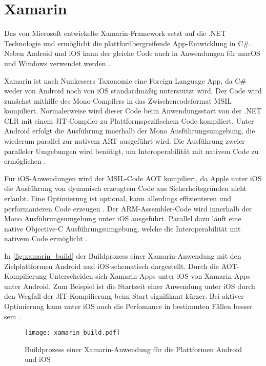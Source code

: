 \section{Xamarin}
\label{sec:Frameworks_Xamarin}

Das von Microsoft entwickelte Xamarin-Framework setzt auf die .NET Technologie und ermöglicht die plattforübergreifende App-Entwicklung in C\#.
Neben Android und iOS kann der gleiche Code auch in Anwendungen für macOS und Windows verwendet werden \cite{Xamarin_Homepage}.



Xamarin ist nach Nunkessers Taxonomie \cite{Nunkesser_Taxonomy} eine Foreign Language App, da C\# weder von Android noch von iOS standardmäßig unterstützt wird.
Der Code wird zunächst mithilfe des Mono-Compilers in das Zwischencodeformat \ac{MSIL} kompiliert.
Normalerweise wird dieser Code beim Anwendungsstart von der .NET \ac{CLR} mit einem \ac{JIT}-Compiler zu Plattformspezifischem Code kompiliert.
Unter Android erfolgt die Ausführung innerhalb der Mono Ausführungsumgebung, die wiederum parallel zur nativem \ac{ART} ausgeführt wird.
Die Ausführung zweier paralleler Umgebungen wird benötigt, um Interoperabilität mit nativem Code zu ermöglichen \cite{Xamarin_Architektur}.


Für iOS-Anwendungen wird der \ac{MSIL}-Code \ac{AOT} kompiliert, da Apple unter iOS die Ausführung von dynamisch erzeugtem Code aus Sicherheitsgründen nicht erlaubt.
Eine Optimierung ist optional, kann allerdings effizienteren und performanteren Code erzeugen \cite{Xamarin_iOS}.
Der ARM-Assembler-Code wird innerhalb der Mono Ausführungsumgebung unter iOS ausgeführt.
Parallel dazu läuft eine native Objective-C Ausführungsumgebung, welche die Interoperabilität mit nativem Code ermöglicht \cite{Xamarin_iOS, Willocx_CrossPlatform_Performance}.

In \autoref{fig:xamarin_build} der Buildprozess einer Xamarin-Anwendung mit den Zielplattformen Android und iOS schematisch dargestellt.
Durch die \ac{AOT}-Kompilierung Unterscheiden sich Xamarin-Apps unter iOS von Xamarin-Apps unter Android.
Zum Beispiel ist die Startzeit einer Anwendung unter iOS durch den Wegfall der \ac{JIT}-Kompilierung beim Start signifikant kürzer.
Bei aktiver Optimierung kann unter iOS auch die Perfomance in bestimmten Fällen besser sein \cite{Nawrocki_Comparison_Hybrid_Native_Frameworks}.
\begin{figure}[h]
    \centering
    \texttt{[image: xamarin\_build.pdf]}
    \caption{Buildprozess einer Xamarin-Anwendung für die Plattformen Android und iOS}
    \label{fig:xamarin_build}
\end{figure}




